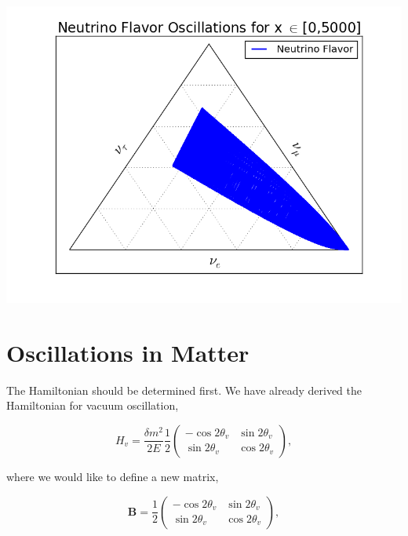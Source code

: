 \documentclass{tufte-handout}
\begin{document}
\begin{marginfigure}
\includegraphics{assets/vacOsc3FlavorTernary5000}
\end{marginfigure}



\section{Oscillations in Matter}


The Hamiltonian should be determined first. We have already derived the Hamiltonian for vacuum oscillation,

\begin{equation*}
H_v=\frac{ \delta m^2 }{2E}\frac{1}{2}\begin{pmatrix} -\cos 2\theta_v & \sin 2 \theta_v \\ \sin 2\theta_v & \cos 2\theta_v  \end{pmatrix},
\end{equation*}


where we would like to define a new matrix,

\begin{equation*}
\mathbf B = \frac{1}{2}\begin{pmatrix}  -\cos 2\theta_v & \sin 2 \theta_v \\ \sin 2\theta_v & \cos 2\theta_v  \end{pmatrix},
\end{equation*}
\end{document}
